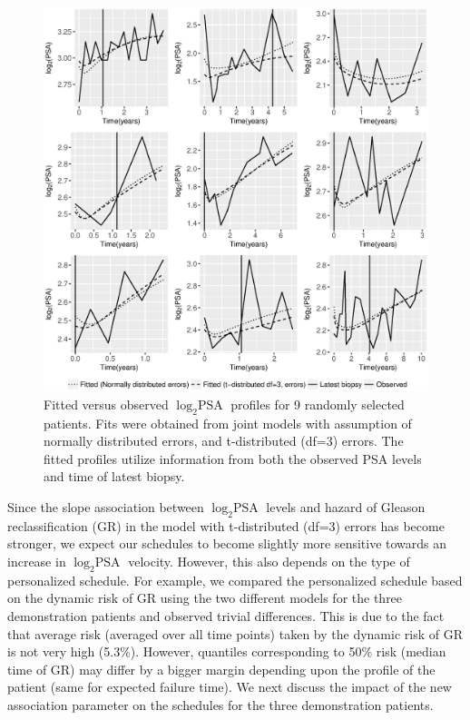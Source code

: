 \begin{enumerate}
    \begin{figure}[!htb]
    \centerline{\includegraphics[width=\columnwidth]{../images/model_fit/subject_fittedVsObserved_psa_norm_t3.eps}}
    \caption{Fitted versus observed $\log_2 \mbox{PSA}$ profiles for 9 randomly selected patients. Fits were obtained from joint models with assumption of normally distributed errors, and t-distributed (df=3) errors. The fitted profiles utilize information from both the observed PSA levels and time of latest biopsy.}
    \label{fig : subject_fittedVsObserved_psa_norm_t3}
    \end{figure}

    Since the slope association between $\log_2 \mbox{PSA}$ levels and hazard of Gleason reclassification (GR) in the model with t-distributed (df=3) errors has become stronger, we expect our schedules to become slightly more sensitive towards an increase in $\log_2 \mbox{PSA}$ velocity. However, this also depends on the type of personalized schedule. For example, we compared the personalized schedule based on the dynamic risk of GR using the two different models for the three demonstration patients and observed trivial differences. This is due to the fact that average risk (averaged over all time points) taken by the dynamic risk of GR is not very high (5.3\%). However, quantiles corresponding to 50\% risk (median time of GR) may differ by a bigger margin depending upon the profile of the patient (same for expected failure time). We next discuss the impact of the new association parameter on the schedules for the three demonstration patients.


\end{enumerate}
